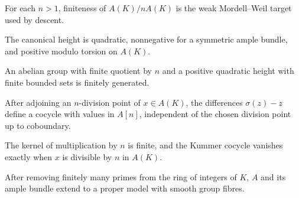 \begin{proposition}
\label{mumford-app2-weak-quotient-finite}
For each $n>1$, finiteness of $A(K)/nA(K)$ is the weak Mordell--Weil target used
by descent.
\notready
\end{proposition}

\begin{proposition}
\label{mumford-app2-height-pairing-target}
The canonical height is quadratic, nonnegative for a symmetric ample bundle,
and positive modulo torsion on $A(K)$.
\notready
\end{proposition}

\begin{proposition}
\label{mumford-app2-abstract-descent}
An abelian group with finite quotient by $n$ and a positive quadratic height with
finite bounded sets is finitely generated.
\notready
\end{proposition}

\begin{lemma}
\label{mumford-app2-kummer-fundamental-lemma}
After adjoining an $n$-division point of $x\in A(K)$, the differences
$\sigma(z)-z$ define a cocycle with values in $A[n]$, independent of the
chosen division point up to coboundary.
\notready
\end{lemma}

\begin{lemma}
\label{mumford-app2-finite-division-kernel}
The kernel of multiplication by $n$ is finite, and the Kummer cocycle vanishes
exactly when $x$ is divisible by $n$ in $A(K)$.
\notready
\end{lemma}

\begin{lemma}
\label{mumford-app2-model-over-open}
After removing finitely many primes from the ring of integers of $K$, $A$ and
its ample bundle extend to a proper model with smooth group fibres.
\notready
\end{lemma}

